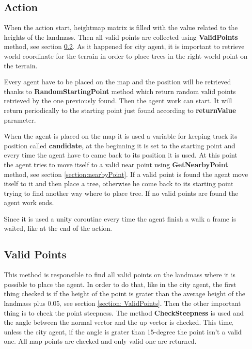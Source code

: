 \documentclass[12pt]{article}
\begin{document}
    \subsection{Action}
    When the action start, heightmap matrix is filled with the value related to the heights of the landmass. Then all valid points are collected using \textbf{ValidPoints} method, see
    section \ref{section:validPoints}. As it happened for city agent, it is important to retrieve world coordinate for the terrain in order to place trees in the right world point on the terrain.

    Every agent have to be placed on the map and the position will be retrieved thanks to \textbf{RandomStartingPoint} method which return random valid points
    retrieved by the one previously found. Then the agent work can start. It will return periodically to the starting point just found according to \textbf{returnValue} parameter. 

    When the agent is placed on the map it is used a variable for keeping track its position called \textbf{candidate}, at the beginning it is set to the starting point and
    every time the agent have to came back to its position it is used. At this point the agent tries to move itself to a valid near point using \textbf{GetNearbyPoint} method, see section \ref{section:nearbyPoint}.
    If a valid point is found the agent move itself to it and then place a tree, otherwise he come back to its starting point trying to find another way where to place tree. If 
    no valid points are found the agent work ends.

    Since it is used a unity coroutine every time the agent finish a walk a frame is waited, like at the end of the action.

    \subsection{Valid Points} \label{section:validPoints}
    This method is responsible to find all valid points on the landmass where it is possible to place the agent. In order to do that, like in the city agent, the first thing checked 
    is if the height of the point is grater than the average height of the landmass plus 0.05, see section \ref{section: ValidPoints}. Then the other important thing is to check the point
    steepness. The method \textbf{CheckSteepness} is used and the angle between the normal vector and the up vector is checked. This time, unless the city agent, if the angle is grater
    than 15-degree the point isn't a valid one. All map points are checked and only valid one are returned.
\end{document}
